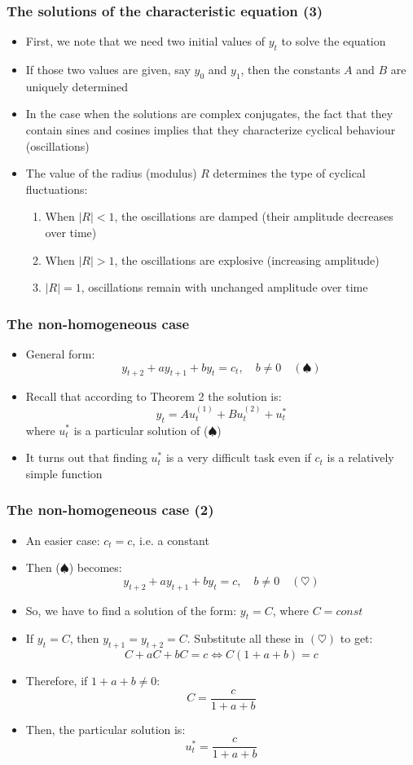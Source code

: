 \documentclass[10pt,usenames,dvipsnames]{beamer}
\theoremstyle{definition}
\begin{document}
\begin{frame}[fragile]
\frametitle{The solutions of the characteristic equation (3)}
\begin{itemize}
	\item First, we note that we need two initial values of $y_{t}$ to solve the equation
	\item If those two values are given, say $y_{0}$ and $y_{1}$, then the constants $A$ and $B$ are uniquely determined
	\item In the case when the solutions are complex conjugates, the fact that they contain sines and cosines implies that they characterize cyclical behaviour (oscillations)
	\item The value of the radius (modulus) $R$ determines the type of cyclical fluctuations:
	\begin{enumerate}
		\item When $|R| < 1$, the oscillations are damped (their amplitude decreases over time)
		\item When $|R| > 1$, the oscillations are explosive (increasing amplitude)
		\item $|R| = 1$, oscillations remain with unchanged amplitude over time
	\end{enumerate}
\end{itemize}
\end{frame}

\begin{frame}[fragile]
\frametitle{The non-homogeneous case}
\begin{itemize}
	\item General form:
	\[
		y_{t+2} + a y_{t+1} + b y_{t} = c_{t}, \quad b \neq 0 \quad (\spadesuit)
	\]
	\item Recall that according to Theorem 2 the solution is:
	\[
		y_{t} = Au_{t}^{(1)} + Bu_{t}^{(2)} + u_{t}^{*}
	\]
	where $u_{t}^{*}$ is a particular solution of ($\spadesuit$)
	\item It turns out that finding $u_{t}^{*}$ is a very difficult task even if $c_{t}$ is a relatively simple function
\end{itemize}
\end{frame}

\begin{frame}[fragile]
\frametitle{The non-homogeneous case (2)}
\begin{itemize}
	\item An easier case: $c_{t} = c$, i.e. a constant
	\item Then ($\spadesuit$) becomes: 
	\[
		y_{t+2} + a y_{t+1} + b y_{t} = c, \quad b \neq 0 \quad (\heartsuit)
	\]
	\item So, we have to find a solution of the form: $y_{t} = C$, where $C = const$
	\item If $y_{t} = C$, then $y_{t+1} = y_{t+2} = C$. Substitute all these in $(\heartsuit)$ to get:
	\[
		C + a C + b C = c \Leftrightarrow C(1 + a + b) = c
	\]
	\item Therefore, if $1 + a + b \neq 0$:
	\[
		C = \frac{c}{1 + a + b} 
	\]
	\item Then, the particular solution is:
	\[
		u_{t}^{*} = \frac{c}{1 + a + b}
	\]
\end{itemize}
\end{frame}
\end{document}
